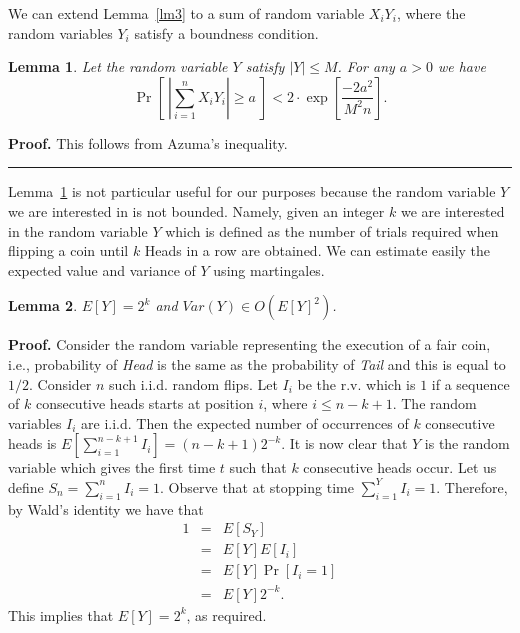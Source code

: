 \documentclass[12pt]{article}
\newtheorem{lemma}{Lemma}
\def\qed{\hfill\rule{2mm}{2mm}}
\begin{document}
We can extend Lemma~\ref{lm3} to a sum of
random variable $X_i Y_i$, where the random variables 
$Y_i$ satisfy a boundness condition.
\begin{lemma}
\label{lm4}
Let the random variable $Y$ satisfy $| Y | \leq M$.
For any $a > 0$ we have
\begin{equation}
\label{rv8:eq}
\Pr \left[ ~\left| \sum_{i=1}^n X_i Y_i \right| \geq a ~ \right]
< 2 \cdot \exp \left[ \frac{-2a^2}{M^2 n} \right].
\end{equation}
\end{lemma}
{\bf Proof.} This follows from Azuma's inequality.
\qed 

Lemma~\ref{lm4} is not particular useful for our purposes
because the random variable $Y$ we are interested in
is not bounded. Namely,
given an integer $k$ we are interested
in the random variable $Y$ which is defined as the number 
of trials required when flipping a coin until $k$
Heads in a row are obtained.
We can estimate easily the expected value and variance of $Y$
using martingales. 
\begin{lemma}
\label{lm5}
$E[Y] = 2^k $ and $Var (Y) \in O(E[Y]^2 )$.
\end{lemma}
{\bf Proof.} 
Consider the random variable representing the
execution of a fair coin, i.e., probability of
{\em Head} is the same as the probability of {\em Tail} 
and this is equal to $1/2$. Consider $n$ such
i.i.d. random flips.  
Let
$I_i$ be the r.v. which is $1$ if a sequence
of $k$ consecutive heads starts at position $i$,
where $i \leq n-k+1$. The random variables $I_i$ are i.i.d.
Then the expected number of occurrences of $k$
consecutive heads is $E[\sum_{i=1}^{n-k+1} I_i]
= (n-k+1) 2^{-k}$. It is now clear that $Y$ is the
random variable which gives the first time $t$
such that $k$ consecutive heads occur. 
Let us define $S_n = \sum_{i=1}^{n} I_i = 1$.
Observe
that at stopping time $\sum_{i=1}^{Y} I_i = 1$.
Therefore, by
Wald's identity we have that 
\begin{eqnarray*}
1 & = & E\left[ S_Y \right] \\
  & = & E[Y] E[I_i ] \\
  & = & E[Y] \Pr [I_i = 1 ] \\
  & = & E[Y] 2^{-k} .
\end{eqnarray*}
This implies that $E[Y] = 2^k$, as required. 
\end{document}
